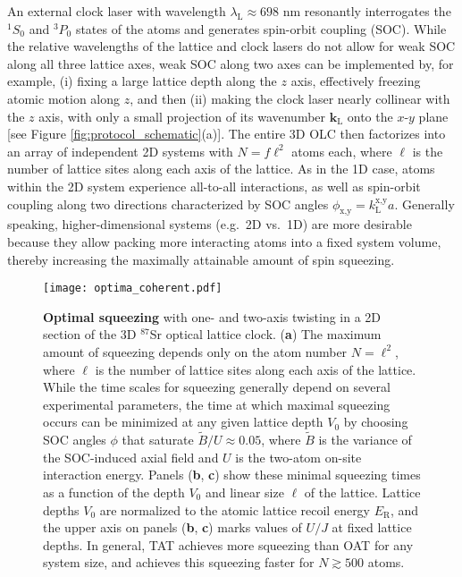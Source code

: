 \documentclass[aps,prx,superscriptaddress,twocolumn]{revtex4-2}
\renewcommand{\t}{\text} %
\renewcommand{\v}{\bm} %
\newcommand{\x}{\text{x}}
\newcommand{\y}{\text{y}}
\begin{document}
An external clock laser with wavelength $\lambda_{\t{L}}\approx698$ nm resonantly interrogates the $^1S_0$ and $^3P_0$ states of the atoms and generates spin-orbit coupling (SOC)\cite{wall2016synthetic}.
While the relative wavelengths of the lattice and clock lasers do not allow for weak SOC along all three lattice axes, weak SOC along two axes can be implemented by, for example, (i) fixing a large lattice depth along the $z$ axis, effectively freezing atomic motion along  $z$, and then (ii) making the clock laser nearly collinear with the $z$ axis, with only a small projection of its wavenumber $\v k_{\t{L}}$ onto the $x$-$y$ plane [see Figure \ref{fig:protocol_schematic}(a)].
The entire 3D OLC then factorizes into an array of independent 2D systems with $N=f\ell^2$ atoms each, where $\ell$ is the number of lattice sites along each axis of the lattice.
As in the 1D case, atoms within the 2D system experience all-to-all interactions, as well as spin-orbit coupling along two directions characterized by SOC angles $\phi_{\x,\y}=k_{\t{L}}^{\x,\y}a$.
Generally speaking, higher-dimensional systems (e.g.~2D vs.~1D) are more desirable because they allow packing more interacting atoms into a fixed system volume, thereby increasing the maximally attainable amount of spin squeezing.

\begin{figure*}
\centering
\texttt{[image: optima\_coherent.pdf]}
\caption{{\bf Optimal squeezing} with one- and two-axis twisting in a 2D section of the 3D $^{87}$Sr optical lattice clock.
({\bf a}) The maximum amount of squeezing depends only on the atom number $N=\ell^2$, where $\ell$ is the number of lattice sites along each axis of the lattice.
While the time scales for squeezing generally depend on several experimental parameters, the time at which maximal squeezing occurs can be minimized at any given lattice depth $V_0$ by choosing SOC angles $\phi$ that saturate $\widetilde{B}/U\approx0.05$, where $\widetilde{B}$ is the variance of the SOC-induced axial field and $U$ is the two-atom on-site interaction energy.
Panels ({\bf b}, {\bf c}) show these minimal squeezing times as a function of the depth $V_0$ and linear size $\ell$ of the lattice.
Lattice depths $V_0$ are normalized to the atomic lattice recoil energy $E_{\t{R}}$, and the upper axis on panels ({\bf b}, {\bf c}) marks values of  $U/J$ at fixed lattice depths.
In general, TAT achieves more squeezing than OAT for any system size, and achieves this squeezing faster for $N\gtrsim500$ atoms.
}
\label{fig:optima_coherent}
\end{figure*}
\end{document}
